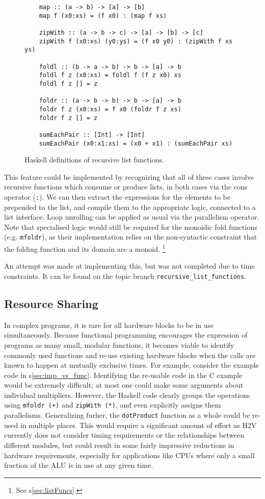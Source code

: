 \documentclass[english,onecolumn]{scrartcl}
\begin{document}
\begin{figure}
\begin{lstlisting}
    map :: (a -> b) -> [a] -> [b]
    map f (x0:xs) = (f x0) : (map f xs)

    zipWith :: (a -> b -> c) -> [a] -> [b] -> [c]
    zipWith f (x0:xs) (y0:ys) = (f x0 y0) : (zipWith f xs ys)

    foldl :: (b -> a -> b) -> b -> [a] -> b
    foldl f z (x0:xs) = foldl f (f z x0) xs
    foldl f z [] = z

    foldr :: (a -> b -> b) -> b -> [a] -> b
    foldr f z (x0:xs) = f x0 (foldr f z xs)
    foldr f z [] = z

    sumEachPair :: [Int] -> [Int]
    sumEachPair (x0:x1:xs) = (x0 + x1) : (sumEachPair xs)
\end{lstlisting}
\caption{Haskell definitions of recursive list functions.\label{lst:recListFuncs}}
\end{figure}

This feature could be implemented by recognizing that all of these cases involve recursive functions which consume or produce
lists, in both cases via the cons operator (\texttt{:}). We can then extract the expressions for the elements to be prepended to
the list, and compile them to the appropriate logic, connected to a list interface. Loop unrolling can be applied as usual via the
parallelism operator. Note that specialised logic would still be required for the monoidic fold functions (e.g. \texttt{mfoldr}),
as their implementation relies on the non-syntactic constraint that the folding function and its domain are a monoid.%
\footnote{See s\ref{sec:listFuncs}.}

An attempt was made at implementing this, but was not completed due to time constraints. It can be found on the topic branch
\texttt{recursive\_list\_functions}.


\subsection{Resource Sharing}
\label{sec:resSharing}
In complex programs, it is rare for all hardware blocks to be in use simultaneously. Because functional programming encourages
the expression of programs as many small, modular functions, it becomes viable to identify commonly used functions and re-use
existing hardware blocks when the calls are known to happen at mutually exclusive times. For example, consider the example
code in s\ref{sec:imp_vs_func}. Identifying the re-usable code in the C example would be extremely difficult; at most one could
make some arguments about individual multipliers. However, the Haskell code clearly groups the operations using
\texttt{mfoldr (+)} and \texttt{zipWith (*)}, and even explicitly assigns them parallelisms.
Generalizing furher, the \texttt{dotProduct} function as a whole could be re-used in multiple places.
This would require a significant amount of effort as H2V currently does not consider timing requirements or
the relationships between different modules, but could result in some fairly impressive reductions in hardware requirements,
especially for applications like CPUs where only a small fraction of the ALU is in use at any given time.
\end{document}

